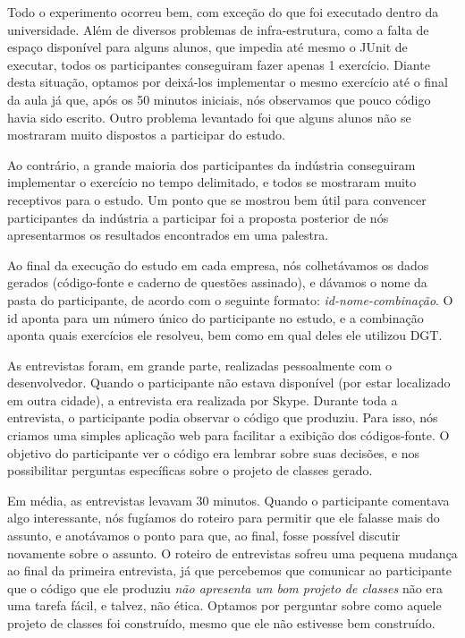 Todo o experimento ocorreu bem, com exceção do que foi executado
dentro da universidade. Além de diversos problemas de infra-estrutura,
como a falta de espaço disponível para alguns alunos, que impedia até mesmo
o JUnit de executar, todos os participantes conseguiram fazer apenas
1 exercício. Diante desta situação, optamos por deixá-los implementar
o mesmo exercício até o final da aula já que, após os 50 minutos iniciais,
nós observamos que pouco código havia sido escrito. Outro problema levantado
foi que alguns alunos não se mostraram muito dispostos a participar
do estudo.

Ao contrário, a grande maioria dos participantes da indústria conseguiram
implementar o exercício no tempo delimitado, e todos se mostraram
muito receptivos para o estudo. Um ponto que se mostrou bem útil
para convencer participantes da indústria a participar foi a proposta
posterior de nós apresentarmos os resultados encontrados em uma palestra.

Ao final da execução do estudo em cada empresa, nós colhetávamos
os dados gerados (código-fonte e caderno de questões assinado),
e dávamos o nome da pasta do participante, de acordo com
o seguinte formato: \textit{id-nome-combinação}. O id aponta
para um número único do participante no estudo, e a combinação
aponta quais exercícios ele resolveu, bem como em qual deles
ele utilizou DGT.

As entrevistas foram, em grande parte, realizadas pessoalmente com 
o desenvolvedor. Quando o participante não estava disponível (por estar
localizado em outra cidade), a entrevista era realizada por Skype.
Durante toda a entrevista, o participante podia observar o código que
produziu. Para isso, nós criamos uma simples aplicação web para facilitar
a exibição dos códigos-fonte. O objetivo do participante ver o código
era lembrar sobre suas decisões, e nos possibilitar perguntas específicas
sobre o projeto de classes gerado.

Em média, as entrevistas levavam 30 minutos. Quando o participante comentava
algo interessante, nós fugíamos do roteiro para permitir que ele falasse mais do assunto,
e anotávamos o ponto para que, ao final, fosse possível discutir novamente sobre o assunto.
O roteiro de entrevistas sofreu uma pequena mudança ao final da primeira entrevista,
já que percebemos que comunicar ao participante que o código que ele produziu
\textit{não apresenta um bom projeto de classes} não era uma tarefa fácil, e talvez, não ética. 
Optamos por perguntar sobre como aquele projeto de classes foi construído, mesmo que ele
não estivesse bem construído.

